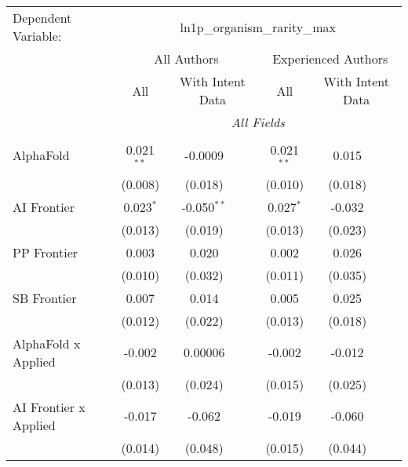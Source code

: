\begingroup
\centering
\begin{tabular}{lcccccc}
   \tabularnewline \midrule \midrule
   Dependent Variable: & \multicolumn{6}{c}{ln1p\_organism\_rarity\_max}\\
 & \multicolumn{3}{c}{All Authors} & \multicolumn{3}{c}{Experienced Authors} \\
\cmidrule(lr){2-4} \cmidrule(lr){5-7}
 & \multicolumn{1}{c}{All} & \multicolumn{2}{c}{With Intent Data} & \multicolumn{1}{c}{All} & \multicolumn{2}{c}{With Intent Data} \\
\cmidrule(lr){2-2} \cmidrule(lr){3-4} \cmidrule(lr){5-5} \cmidrule(lr){6-7}
 & \multicolumn{6}{c}{\textit{All Fields}} \\ \\
   AlphaFold                      & 0.021$^{**}$ & -0.0009       &              & 0.021$^{**}$ & 0.015   &   \\   
                                  & (0.008)      & (0.018)       &              & (0.010)      & (0.018) &   \\   
   AI Frontier                    & 0.023$^{*}$  & -0.050$^{**}$ &              & 0.027$^{*}$  & -0.032  &   \\   
                                  & (0.013)      & (0.019)       &              & (0.013)      & (0.023) &   \\   
   PP Frontier                    & 0.003        & 0.020         &              & 0.002        & 0.026   &   \\   
                                  & (0.010)      & (0.032)       &              & (0.011)      & (0.035) &   \\   
   SB Frontier                    & 0.007        & 0.014         &              & 0.005        & 0.025   &   \\   
                                  & (0.012)      & (0.022)       &              & (0.013)      & (0.018) &   \\   
   AlphaFold x Applied            & -0.002       & 0.00006       &              & -0.002       & -0.012  &   \\   
                                  & (0.013)      & (0.024)       &              & (0.015)      & (0.025) &   \\   
   AI Frontier x Applied          & -0.017       & -0.062        &              & -0.019       & -0.060  &   \\   
                                  & (0.014)      & (0.048)       &              & (0.015)      & (0.044) &   \\   

\end{tabular}
